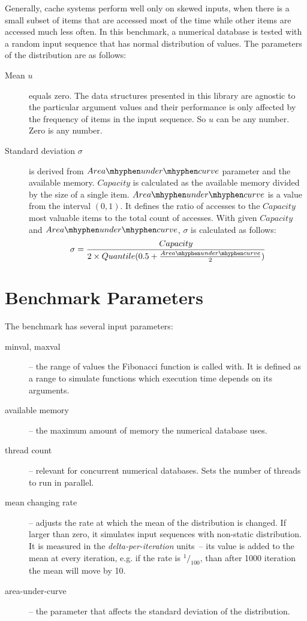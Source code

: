 Generally, cache systems perform well only on skewed inputs, when there is a small subset of items that are accessed most of the time while other items are accessed much less often. In this benchmark, a numerical database is tested with a random input sequence that has normal distribution of values. The parameters of the distribution are as follows:
\begin{description}
\item[Mean $u$] equals zero. The data structures presented in this library are agnostic to the particular argument values and their performance is only affected by the frequency of items in the input sequence. So $u$ can be any number. Zero is any number.

\item [Standard deviation $\sigma$] is derived from $Area{\mhyphen}under{\mhyphen}curve$ parameter and the available memory. $Capacity$ is calculated as the available memory divided by the size of a single item. $Area{\mhyphen}under{\mhyphen}curve$ is a value from the interval $(0,1)$. It defines the ratio of accesses to the $Capacity$ most valuable items to the total count of accesses. With given $Capacity$ and $Area{\mhyphen}under{\mhyphen}curve$, $\sigma$ is calculated as follows:
\begin{equation}
 \sigma = \frac{Capacity}{2 \times Quantile(0.5 + \frac{Area{\mhyphen}under{\mhyphen}curve}{2})}
 \end{equation}
\end{description}

\section{Benchmark Parameters}
The benchmark has several input parameters:
\begin{description}
\item [minval, maxval]-- the range of values the Fibonacci function is called with. It is defined as a range to simulate functions which execution time depends on its arguments.
\item [available memory]-- the maximum amount of memory the numerical database uses.
\item [thread count]-- relevant for concurrent numerical databases. Sets the number of  threads to run in parallel.
\item[mean changing rate]-- adjusts the rate at which the mean of the distribution is changed. If larger than zero, it simulates input sequences with non-static distribution. It is measured in the \emph{delta-per-iteration} units~-- its value is added to the mean at every iteration, e.g. if the rate is $^1/_{100}$, than after 1000 iteration the mean will move by 10.
\item[area-under-curve]-- the parameter that affects the standard deviation of the distribution.
\end{description}

